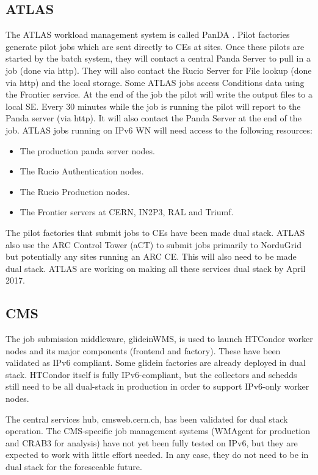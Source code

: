 \documentclass[11pt]{article}
\begin{document}
\subsection{ATLAS}
The ATLAS workload management system is called PanDA \cite{Panda}.  Pilot factories generate pilot jobs which are sent directly to CEs at sites.  Once these pilots are started by the batch system, they will contact a central Panda Server to pull in a job (done via http).  They will also contact the Rucio Server for File lookup (done via http) and the local storage.  Some ATLAS jobs access Conditions data using the Frontier service.  At the end of the job the pilot will write the output files to a local SE.  Every 30 minutes while the job is running the pilot will report to the Panda server (via http).  It will also contact the Panda Server at the end of the job.  ATLAS jobs running on IPv6 WN will need access to the following resources:
\begin{itemize}
\item The production panda server nodes.
\item The Rucio Authentication nodes.
\item The Rucio Production nodes.
\item The Frontier servers at CERN, IN2P3, RAL and Triumf.
\end{itemize}  
The pilot factories that submit jobs to CEs have been made dual stack.  ATLAS also use the ARC Control Tower (aCT) to submit jobs primarily to NorduGrid but potentially any sites running an ARC CE.  This will also need to be made dual stack.  ATLAS are working on making all these services dual stack by April 2017.


\subsection{CMS}
The job submission middleware, glideinWMS, is used to launch HTCondor worker nodes and its major components (frontend and factory).  These have been validated as IPv6 compliant. Some glidein factories are already deployed in dual stack. HTCondor itself is fully IPv6-compliant, but the collectors and schedds still need to be all dual-stack in production in order to support IPv6-only worker nodes.

The central services hub, cmsweb.cern.ch, has been validated for dual stack operation.  The CMS-specific job management systems (WMAgent for production and CRAB3 for analysis) have not yet been fully tested on IPv6, but they are expected to work with little effort needed. In any case, they do not need to be in dual stack for the foreseeable future.
\end{document}
